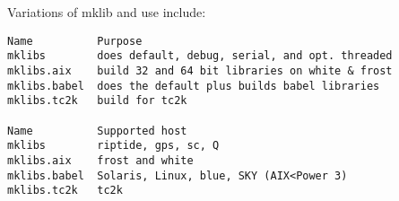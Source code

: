 Variations of mklib and use include:
\begin{bfseries}
\begin{verbatim}
Name          Purpose
mklibs        does default, debug, serial, and opt. threaded
mklibs.aix    build 32 and 64 bit libraries on white & frost
mklibs.babel  does the default plus builds babel libraries
mklibs.tc2k   build for tc2k

Name          Supported host
mklibs        riptide, gps, sc, Q
mklibs.aix    frost and white
mklibs.babel  Solaris, Linux, blue, SKY (AIX<Power 3)
mklibs.tc2k   tc2k
\end{verbatim}
\end{bfseries}
